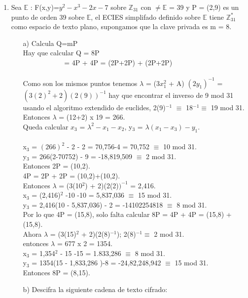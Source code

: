 \documentclass[10pt,a4paper]{article}
\begin{document}
\begin{enumerate}
\begin{itemize}
\end{itemize}
\item Sea $\mathbb{E}$ : F(x,y)=$y^{2}-x^{3}-2x-7$ sobre $\mathbb{Z}_{31}$ con $\neq \mathbb{E}$ = 39 y P = (2,9) es un punto de orden 39 sobre $\mathbb{E}$, el ECIES simplifado definido sobre $\mathbb{E}$ tiene $\mathbb{Z}^{*}_{31}$ como espacio de texto plano, supongamos que la clave privada es m = 8.
\begin{itemize}
\item[a)] Calcula Q=mP\\
Hay que calcular Q = 8P\\$ ~~~~~~~~~~~~~~~~~~~~~~~~~~~$= 4P + 4P = (2P+2P) + (2P+2P)\\\\
Como son los mismos puntos tenemos $\lambda$ = (3$x_{1}^{2}$ + A) $(2y_{1})^{-1}$ = $(3(2)^{2} + 2)(2(9))^{-1}$ hay que encontrar el inverso de 9 mod 31 usando el algoritmo extendido de euclides, 2(9)$^{-1}$ $\equiv$ 18$^{-1} \equiv $ 19 mod 31.\\
Entonces $\lambda$ = (12+2) x 19 = 266.\\
Queda calcular $x_{3}$ = $\lambda^{2} - x_{1} - x_{2}$, y$_3$ = $\lambda(x_{1} - x_{3}) - y_{1}$.
\\
\\x$_{3}$ = $(266)^{2}$ - 2 - 2 = 70,756-4 = 70,752 $\equiv$ 10 mod 31.
\\y$_{3}$ = 266(2-70752) - 9 = -18,819,509 $\equiv$  2 mod 31.\\
Entonces 2P = (10,2).\\
4P = 2P + 2P =  (10,2)+(10,2).\\
Entonces $\lambda$ = (3(10$^{2}$) + 2)(2(2)$)^{-1}$ = 2,416.\\
x$_{3}$ = (2,416)$^{2}$ -10 -10 = 5,837,036 $\equiv$ 15 mod 31.\\
y$_{3}$ = 2,416(10 - 5,837,036) - 2 = -14102254818 $\equiv$ 8 mod 31.\\
Por lo que 4P = (15,8), solo falta calcular 8P = 4P + 4P = (15,8) + (15,8).\\
Ahora $\lambda$ = (3(15)$^{2}$ + 2)(2(8)$^{-1}$); 2(8)$^{-1} \equiv $ 2 mod 31. \\
entonces $\lambda$ = 677 x 2 = 1354.\\
x$_{3}$ = 1,354$^{2}$ - 15 -15 = 1.833,286 $\equiv$ 8 mod 31.\\
y$_{3}$ = 1354(15 - 1,833,286 )-8 = -24,82,248,942 $\equiv$ 15 mod 31.\\
Entonces 8P = (8,15).
\item[b)] Descifra la siguiente cadena de texto cifrado: \\

\end{itemize}
\end{enumerate}
\end{document}
